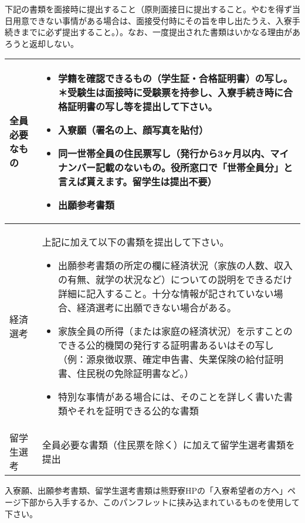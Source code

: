 下記の書類を面接時に提出すること（原則面接日に提出すること。やむを得ず当日用意できない事情がある場合は、面接受付時にその旨を申し出たうえ、入寮手続きまでに必ず提出すること。）。なお、一度提出された書類はいかなる理由があろうと返却しない。
\begin{table}[htb]
  \begin{tabular}{|l|p{}|}
    \hline
    全員必要なもの & \vspace{-5mm}\begin{itemize}
        \item 学籍を確認できるもの（学生証・合格証明書）の写し。＊受験生は面接時に受験票を持参し、入寮手続き時に合格証明書の写し等を提出して下さい。
        \item 入寮願（署名の上、顔写真を貼付）
        \item 同一世帯全員の住民票写し（発行から3ヶ月以内、マイナンバー記載の\textbf{ない}もの。役所窓口で「世帯全員分」と言えば貰えます。留学生は提出不要）
        \item 出願参考書類
    \end{itemize}\vspace{-5mm} \\ \hline
    経済選考 & 上記に加えて以下の書類を提出して下さい。
    \vspace{-3mm}
    \begin{itemize}
      \item 出願参考書類の所定の欄に経済状況（家族の人数、収入の有無、就学の状況など）についての説明をできるだけ詳細に記入すること。十分な情報が記されていない場合、経済選考に出願できない場合がある。
      \item 家族全員の所得（または家庭の経済状況）を示すことのできる公的機関の発行する証明書あるいはその写し （例：源泉徴収票、確定申告書、失業保険の給付証明書、住民税の免除証明書など。）
      \item 特別な事情がある場合には、そのことを詳しく書いた書類やそれを証明できる公的な書類
    \end{itemize}\vspace{-0.8cm} \\ \hline
    留学生選考 & 全員必要な書類（住民票を除く）に加えて留学生選考書類を提出
    \\ \hline
  \end{tabular}
\end{table}


\noindent 入寮願、出願参考書類、留学生選考書類は熊野寮HPの「入寮希望者の方へ」ページ下部から入手するか、このパンフレットに挟み込まれているものを使用して下さい。

